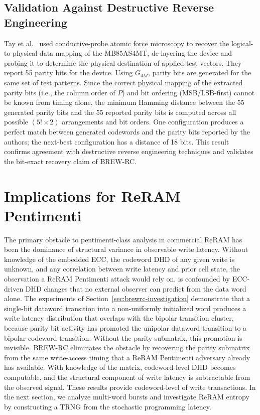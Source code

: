 \subsection{Validation Against Destructive Reverse Engineering}
Tay et al.~\cite{tay2023afm} used conductive-probe atomic force
microscopy to recover the logical-to-physical data mapping of the
MB85AS4MT, de-layering the device and probing it to determine the
physical destination of applied test vectors. They report 55 parity bits
for the device. Using $G_{4M}$, parity bits are generated for the same
set of test patterns. Since the correct physical mapping of the
extracted parity bits (i.e., the column order of $P$) and bit ordering
(MSB/LSB-first) cannot be known from timing alone, the minimum Hamming
distance between the 55 generated parity bits and the 55 reported parity
bits is computed across all possible $(5! \times 2)$ arrangements and
bit orders. One configuration produces a perfect match between generated
codewords and the parity bits reported by the authors; the next-best
configuration has a distance of 18 bits. This result confirms agreement
with destructive reverse engineering techniques and validates the
bit-exact recovery claim of BREW-RC.

\section{Implications for ReRAM Pentimenti}
\label{sec:reram-pentimenti-implications}

The primary obstacle to pentimenti-class analysis in commercial ReRAM
has been the dominance of structural variance in observable write
latency. Without knowledge of the embedded ECC, the codeword DHD of any
given write is unknown, and any correlation between write latency and
prior cell state, the observation a ReRAM Pentimenti attack would rely
on, is confounded by ECC-driven DHD changes that no external observer
can predict from the data word alone. The experiments of
Section~\ref{sec:brewrc-investigation} demonstrate that a single-bit
dataword transition into a non-uniformly initialized word produces a
write latency distribution that overlaps with the bipolar transition
cluster, because parity bit activity has promoted the unipolar dataword
transition to a bipolar codeword transition. Without the parity
submatrix, this promotion is invisible. BREW-RC eliminates the obstacle
by recovering the parity submatrix from the same write-access timing
that a ReRAM Pentimenti adversary already has available. With knowledge
of the matrix, codeword-level DHD becomes computable, and the structural
component of write latency is subtractable from the observed signal.
These results provide codeword-level of write transactions. In the next
section, we analyze multi-word bursts and investigate ReRAM entropy by
constructing a TRNG from the stochastic programming latency.

